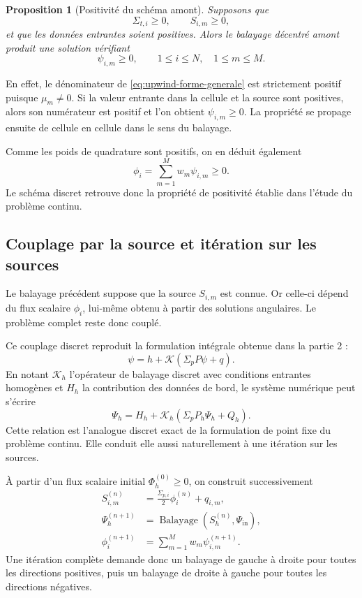 \documentclass{article}
\newtheorem{proposition}[theorem]{Proposition}
\begin{document}
\begin{proposition}[Positivité du schéma amont]
    Supposons que
    \[
        \Sigma_{t,i}\geq0, \qquad  S_{i,m}\geq0,
    \]
    et que les données entrantes soient positives. Alors le balayage décentré amont produit une solution vérifiant
    \[
        \psi_{i,m}\geq0,  \qquad  1\leq i\leq N, \quad  1\leq m\leq M.
    \]
\end{proposition}

En effet, le dénominateur de \eqref{eq:upwind-forme-generale} est strictement positif puisque $\mu_m\neq0$. Si la valeur entrante dans la cellule et la source sont positives, alors son numérateur est positif et l'on obtient $\psi_{i,m}\geq0$. La propriété se propage ensuite de cellule en cellule dans le sens du balayage.

Comme les poids de quadrature sont positifs, on en déduit également
\[
    \phi_i = \sum_{m=1}^{M}w_m\psi_{i,m} \geq 0.
\]
Le schéma discret retrouve donc la propriété de positivité établie dans l'étude du problème continu.

\subsection {Couplage par la source et itération sur les sources}

Le balayage précédent suppose que la source $S_{i,m}$ est connue. Or celle-ci dépend du flux scalaire $\phi_i$, lui-même obtenu à partir des solutions angulaires. Le problème complet reste donc couplé.

Ce couplage discret reproduit la formulation intégrale obtenue dans la partie 2 :
\[
    \psi = h+\mathcal K\left(\Sigma_pP\psi+q\right).
\]
En notant $\mathcal K_h$ l'opérateur de balayage discret avec conditions entrantes homogènes et $H_h$ la contribution des données de bord, le système numérique peut s'écrire
\begin{equation}
    \Psi_h = H_h + \mathcal K_h \left(\Sigma_pP_h\Psi_h+Q_h\right).
    \label{eq:point-fixe-transport-discret}
\end{equation}
Cette relation est l'analogue discret exact de la formulation de point fixe du problème continu. Elle conduit elle aussi naturellement à une itération sur les sources.

À partir d'un flux scalaire initial $\Phi_h^{(0)}\geq0$, on construit successivement
\begin{equation}
    \boxed{
    \begin{aligned}
        S_{i,m}^{(n)} &= \frac{\Sigma_{p,i}}{2}\phi_i^{(n)} +q_{i,m},\\[0.15cm]
        \Psi_h^{(n+1)} &= \operatorname{Balayage} \left(S_h^{(n)},\Psi_{\mathrm{in}}\right),\\[0.15cm]
        \phi_i^{(n+1)} &= \sum_{m=1}^{M} w_m\psi_{i,m}^{(n+1)}.
    \end{aligned}
    }
    \label{eq:iteration-sources-transport}
\end{equation}
Une itération complète demande donc un balayage de gauche à droite pour toutes les directions positives, puis un balayage de droite à gauche pour toutes les directions négatives.
\end{document}
